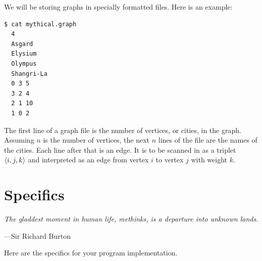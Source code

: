 \documentclass[11pt]{article}
\begin{document}
We will be storing graphs in specially formatted files. Here is an
example:

\begin{lstlisting}[style=bashstyle]
  $ cat mythical.graph
  4
  Asgard
  Elysium
  Olympus
  Shangri-La
  0 3 5
  3 2 4
  2 1 10
  1 0 2
\end{lstlisting}

The first line of a graph file is the number of vertices, or cities, in
the graph. Assuming $n$ is the number of vertices, the next $n$ lines
of the file are the names of the cities. Each line after that is an
edge. It is to be scanned in as a triplet $\langle i,j,k \rangle$ and
interpreted as an edge from vertex $i$ to vertex $j$ with weight $k$.

\section{Specifics}

\textwidth
\epigraph{\emph{The gladdest moment in
human life, methinks, is a departure into unknown lands.}}{---Sir
Richard Burton}

Here are the specifics for your program implementation.
\end{document}

